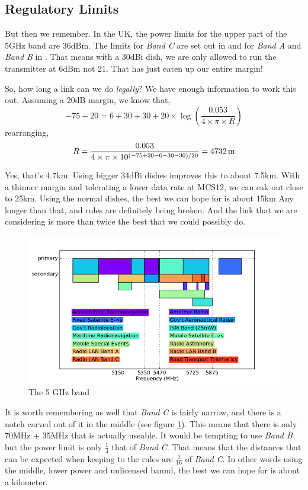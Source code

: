 \subsection{Regulatory Limits}
\label{sec:regulatory}

But then we remember. In the UK, the power limits for the upper part
of the 5GHz band are 36dBm. The limits for \textit{Band C} are set out
in \cite{IR2007} and for \textit{Band A} and \textit{Band B} in
\cite{IR2006}. That means with a 30dBi dish, we are only allowed to
run the transmitter at 6dBm not 21. That has just eaten up our entire
margin!

So, how long a link can we do \textit{legally}? We have enough
information to work this out. Assuming a 20dB margin, we know that,
$$
-75 + 20 = 6 + 30 + 30 + 20 \times
\log \left(\frac{0.053}{4 \times \pi \times R} \right)
$$
rearranging,
$$
R = \frac{%
  0.053
}{%
  4 \times \pi \times 10^{\left(-75 + 20 - 6 - 30 - 30\right)/20}%
} = 4732\, \mathrm{m}
$$

Yes, that's 4.7km. Using bigger 34dBi dishes improves this to about
7.5km. With a thinner margin and tolerating a lower data rate at
MCS12, we can eak out close to 25km. Using the normal dishes, the best
we can hope for is about 15km Any longer than that, and rules are
definitely being broken. And the link that we are considering is more
than twice the best that we could possibly do.

\begin{figure}[h]
  \begin{center}
    \includegraphics[width=\textwidth]{spectrum.png}
  \end{center}
  \caption{The 5 GHz band}
  \label{fig:5GHz}
\end{figure}

It is worth remembering as well that \textit{Band C} is fairly narrow,
and there is a notch carved out of it in the middle (see figure
\ref{fig:5GHz}). This means that there is only 70MHz + 35MHz that is
actually useable. It would be tempting to use \textit{Band B} but the
power limit is only $\frac{1}{4}$ that of \textit{Band C}. That means
that the distances that can be expected when keeping to the rules are
$\frac{1}{16}$ of \textit{Band C}. In other words using the middle,
lower power and unlicensed bannd, the best we can hope for is about a
kilometer.

